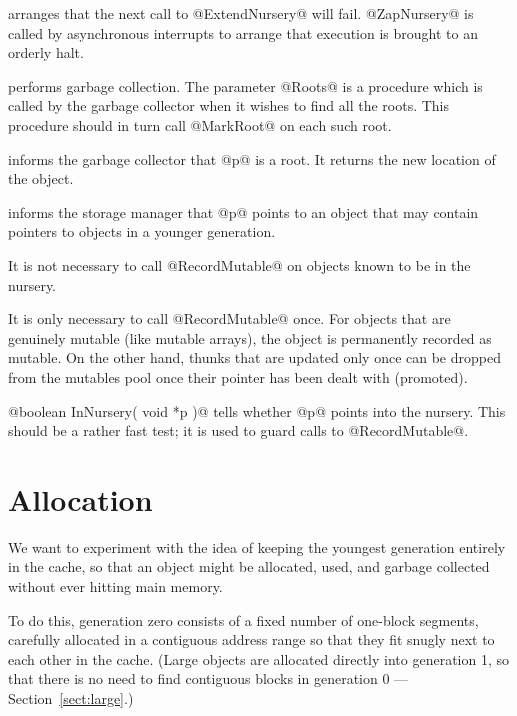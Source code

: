 \documentclass{article}
\newcommand{\block}{block}
\newcommand{\segment}{segment}
\begin{document}
\begin{description}
\item[@ZapNursery()@] arranges that the next call to @ExtendNursery@
will fail.  @ZapNursery@ is called by asynchronous interrupts to arrange that 
execution is brought to an orderly halt.

\item[@GarbageCollect( void *Roots )@] performs garbage collection.
The parameter @Roots@ is a procedure which is called by the garbage
collector when it wishes to find all the roots.  This procedure
should in turn call @MarkRoot@ on each such root.

\item[@void *MarkRoot( void *p )@] informs the garbage collector that
@p@ is a root.  It returns the new location of the object.

\item[@RecordMutable( void *p )@] informs the storage manager that
@p@ points to an object that may contain pointers to objects in
a younger generation.

It is not necessary to call @RecordMutable@ on objects known to
be in the nursery.

It is only necessary to call @RecordMutable@ once.  For objects that
are genuinely mutable (like mutable arrays), the object is permanently
recorded as mutable.  On the other hand, thunks that are updated only
once can be dropped from the mutables pool once their pointer has been
dealt with (promoted).

\item{@boolean InNursery( void *p )@} tells whether @p@ points into
the nursery.  This should be a rather fast test; it is used to guard
calls to @RecordMutable@.
\end{description}


\section{Allocation}

We want to experiment with the idea of keeping the youngest generation
entirely in the cache, so that an object might be allocated, used,
and garbage collected without ever hitting main memory.

To do this, generation zero consists of a fixed number of one-\block{}
\segment{}s, carefully allocated in a contiguous address range so that
they fit snugly next to each other in the cache.  
(Large objects are allocated directly into generation 1,
so that there is no need to find contiguous \block{}s in generation 0 --- Section~\ref{sect:large}.)
\end{document}
